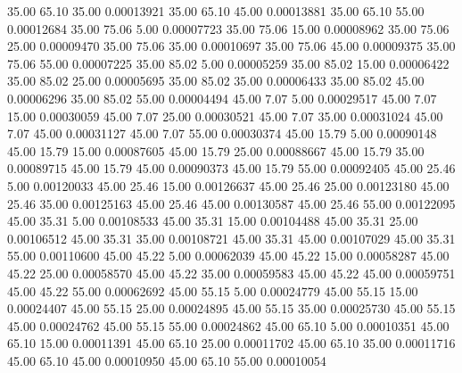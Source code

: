      35.00     65.10     35.00     0.00013921
     35.00     65.10     45.00     0.00013881
     35.00     65.10     55.00     0.00012684
     35.00     75.06      5.00     0.00007723
     35.00     75.06     15.00     0.00008962
     35.00     75.06     25.00     0.00009470
     35.00     75.06     35.00     0.00010697
     35.00     75.06     45.00     0.00009375
     35.00     75.06     55.00     0.00007225
     35.00     85.02      5.00     0.00005259
     35.00     85.02     15.00     0.00006422
     35.00     85.02     25.00     0.00005695
     35.00     85.02     35.00     0.00006433
     35.00     85.02     45.00     0.00006296
     35.00     85.02     55.00     0.00004494
     45.00      7.07      5.00     0.00029517
     45.00      7.07     15.00     0.00030059
     45.00      7.07     25.00     0.00030521
     45.00      7.07     35.00     0.00031024
     45.00      7.07     45.00     0.00031127
     45.00      7.07     55.00     0.00030374
     45.00     15.79      5.00     0.00090148
     45.00     15.79     15.00     0.00087605
     45.00     15.79     25.00     0.00088667
     45.00     15.79     35.00     0.00089715
     45.00     15.79     45.00     0.00090373
     45.00     15.79     55.00     0.00092405
     45.00     25.46      5.00     0.00120033
     45.00     25.46     15.00     0.00126637
     45.00     25.46     25.00     0.00123180
     45.00     25.46     35.00     0.00125163
     45.00     25.46     45.00     0.00130587
     45.00     25.46     55.00     0.00122095
     45.00     35.31      5.00     0.00108533
     45.00     35.31     15.00     0.00104488
     45.00     35.31     25.00     0.00106512
     45.00     35.31     35.00     0.00108721
     45.00     35.31     45.00     0.00107029
     45.00     35.31     55.00     0.00110600
     45.00     45.22      5.00     0.00062039
     45.00     45.22     15.00     0.00058287
     45.00     45.22     25.00     0.00058570
     45.00     45.22     35.00     0.00059583
     45.00     45.22     45.00     0.00059751
     45.00     45.22     55.00     0.00062692
     45.00     55.15      5.00     0.00024779
     45.00     55.15     15.00     0.00024407
     45.00     55.15     25.00     0.00024895
     45.00     55.15     35.00     0.00025730
     45.00     55.15     45.00     0.00024762
     45.00     55.15     55.00     0.00024862
     45.00     65.10      5.00     0.00010351
     45.00     65.10     15.00     0.00011391
     45.00     65.10     25.00     0.00011702
     45.00     65.10     35.00     0.00011716
     45.00     65.10     45.00     0.00010950
     45.00     65.10     55.00     0.00010054
